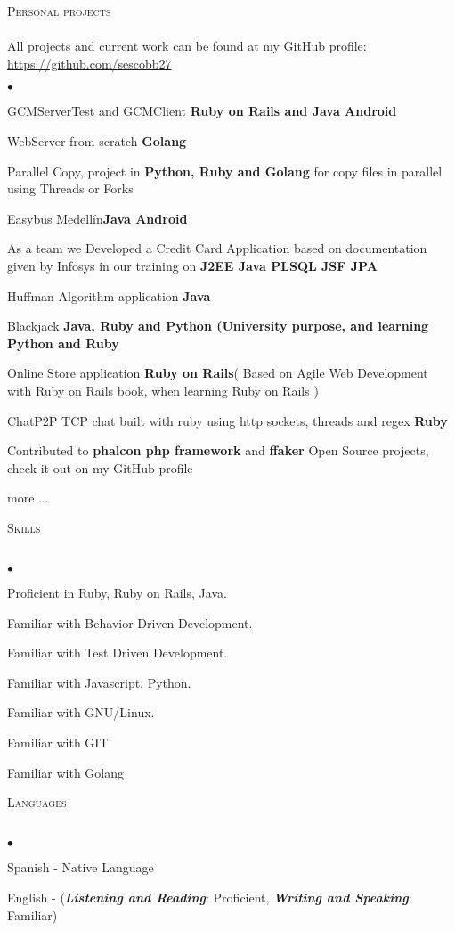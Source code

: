 \documentclass[a4paper]{article}
\newcommand{\lineunder}{\vspace*{-8pt} \\ \hspace*{-18pt} \hrulefill \\}
\newcommand{\header}[1]{{\hspace*{-15pt}\vspace*{6pt}
    \textsc{#1}} \vspace*{-6pt} \lineunder}
\newenvironment{achievements}{\begin{list}{$\bullet$}{\topsep 0pt \itemsep
      -2pt}}{\vspace*{4pt}\end{list}}
\newcommand{\programming}[1]{{\textbf{#1}}}
\newcommand{\emphasys}[1]{\textbf{\emph{#1}}}
\begin{document}
\header{Personal projects}
All projects and current work can be found at my GitHub profile: \url{https://github.com/sescobb27}
\begin{achievements}
\item{GCMServerTest and GCMClient} \programming{Ruby on Rails and Java Android}
\item{WebServer from scratch} \programming{Golang}
\item{Parallel Copy, project in \programming{Python, Ruby and Golang} for copy files in parallel using Threads or Forks}
\item{Easybus Medell\'in}\programming{Java Android}
\item{As a team we Developed a Credit Card Application based on documentation given by Infosys in our training on \programming{J2EE Java PLSQL JSF JPA}}
\item{Huffman Algorithm application \programming{Java}}
\item{Blackjack \programming{Java, Ruby and Python (University purpose, and learning Python and Ruby}}
\item{Online Store application \programming{Ruby on Rails}( Based on Agile Web Development with Ruby on Rails book, when learning Ruby on Rails )}
\item{ChatP2P TCP chat built with ruby using http sockets, threads and regex \programming{Ruby}}
\item{Contributed to \programming{phalcon php framework} and \programming{ffaker} Open Source projects, check it out on my GitHub profile}
\item{more ...}
\end{achievements}
\newpage

\header{Skills}
\begin{achievements}
\item {Proficient in Ruby, Ruby on Rails, Java.}
\item {Familiar with Behavior Driven Development.}
\item {Familiar with Test Driven Development.}
\item {Familiar with Javascript, Python.}
\item {Familiar with GNU/Linux.}
\item {Familiar with GIT}
\item {Familiar with Golang}
\end{achievements}

\header{Languages}
\begin{achievements}
\item{Spanish - Native Language}
\item{English - (\emphasys{Listening and Reading}: Proficient, \emphasys{Writing and Speaking}: Familiar)}
\end{achievements}
\end{document}
